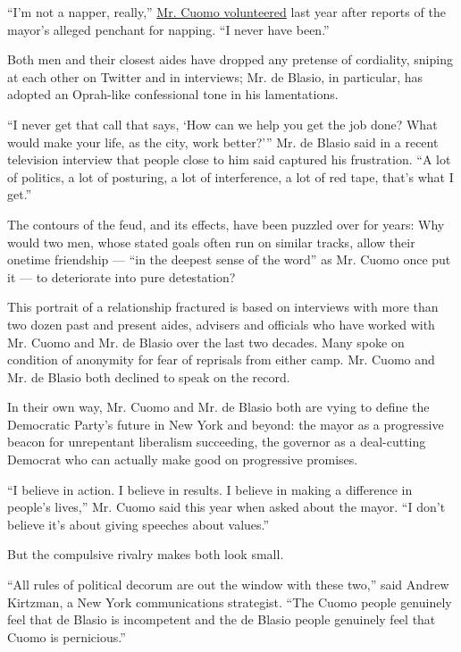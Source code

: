 ``I'm not a napper, really,''
\href{http://www.nydailynews.com/news/politics/cuomo-doesn-nap-job-swipe-de-blasio-article-1.3398215}{Mr.
Cuomo volunteered} last year after reports of the mayor's alleged
penchant for napping. ``I never have been.''

Both men and their closest aides have dropped any pretense of
cordiality, sniping at each other on Twitter and in interviews; Mr. de
Blasio, in particular, has adopted an Oprah-like confessional tone in
his lamentations.

``I never get that call that says, `How can we help you get the job
done? What would make your life, as the city, work better?''' Mr. de
Blasio said in a recent television interview that people close to him
said captured his frustration. ``A lot of politics, a lot of posturing,
a lot of interference, a lot of red tape, that's what I get.''

The contours of the feud, and its effects, have been puzzled over for
years: Why would two men, whose stated goals often run on similar
tracks, allow their onetime friendship --- ``in the deepest sense of the
word'' as Mr. Cuomo once put it --- to deteriorate into pure
detestation?

This portrait of a relationship fractured is based on interviews with
more than two dozen past and present aides, advisers and officials who
have worked with Mr. Cuomo and Mr. de Blasio over the last two decades.
Many spoke on condition of anonymity for fear of reprisals from either
camp. Mr. Cuomo and Mr. de Blasio both declined to speak on the record.

In their own way, Mr. Cuomo and Mr. de Blasio both are vying to define
the Democratic Party's future in New York and beyond: the mayor as a
progressive beacon for unrepentant liberalism succeeding, the governor
as a deal-cutting Democrat who can actually make good on progressive
promises.

``I believe in action. I believe in results. I believe in making a
difference in people's lives,'' Mr. Cuomo said this year when asked
about the mayor. ``I don't believe it's about giving speeches about
values.''

But the compulsive rivalry makes both look small.

``All rules of political decorum are out the window with these two,''
said Andrew Kirtzman, a New York communications strategist. ``The Cuomo
people genuinely feel that de Blasio is incompetent and the de Blasio
people genuinely feel that Cuomo is pernicious.''

